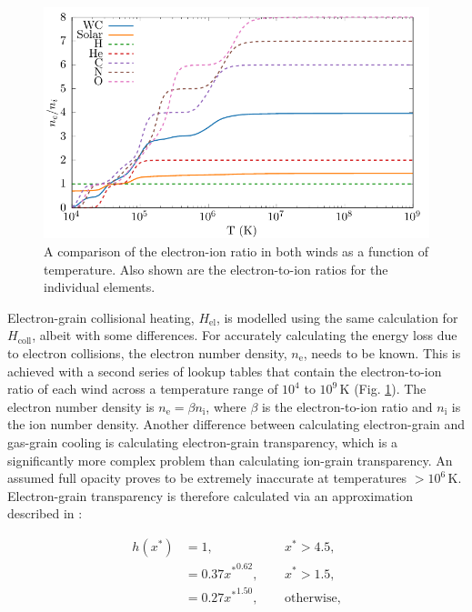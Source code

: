 \documentclass[fleqn,usenatbib]{mnras}
\newcommand{\rms}[1]{\ensuremath{_{\text{#1}}}}
\begin{document}
\begin{figure}
  \centering
  \includegraphics[width=\linewidth]{assets/ionisation-fraction/ionisation-fraction.pdf}
  \caption[OB and WR electron-ion ratios]{A comparison of the electron-ion ratio in both winds as a function of temperature. Also shown are the electron-to-ion ratios for the individual elements.}
  \label{fig:electron-curve}
\end{figure}

Electron-grain collisional heating, $H_\text{el}$, is modelled using the same calculation for $H_\text{coll}$, albeit with some differences.
For accurately calculating the energy loss due to electron collisions, the electron number density, $n\rms{e}$, needs to be known.
This is achieved with a second series of lookup tables that contain the electron-to-ion ratio of each wind across a temperature range of $10^4$ to $10^9\,\si{\kelvin}$ (Fig. \ref{fig:electron-curve}).
The electron number density is $n \rms e = \beta n \rms i$, where $\beta$ is the electron-to-ion ratio and $n \rms i$ is the ion number density.
Another difference between calculating electron-grain and gas-grain cooling is calculating electron-grain transparency, which is a significantly more complex problem than calculating ion-grain transparency.
An assumed full opacity proves to be extremely inaccurate at temperatures $>10^6\,\si{\kelvin}$.
Electron-grain transparency is therefore calculated via an approximation described in \cite{dwek_infrared_1981}:

\begin{equation}
  \begin{alignedat}{3}
    h(x^*) & = 1 ,                && ~~ x^* > 4.5, \\
           & = 0.37{x^*}^{0.62} , && ~~ x^* > 1.5 , \\
           & = 0.27{x^*}^{1.50} , && ~~ \text{otherwise,}
  \end{alignedat}
\end{equation}
\end{document}
